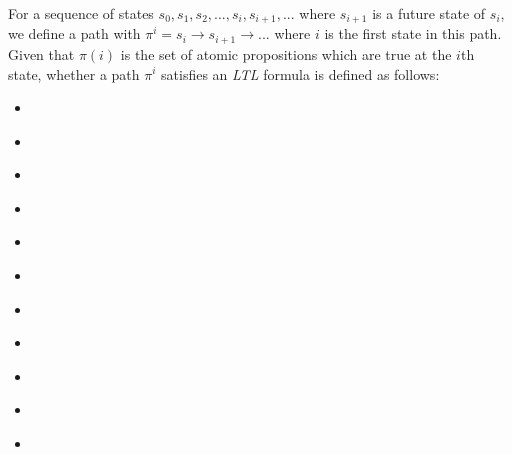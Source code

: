 For a sequence of states $s_0, s_1, s_2, ..., s_i, s_{i + 1}, ...$ where $s_{i + 1}$ is a future state of $s_i$, we define a path with $\pi^i = s_i \rightarrow s_{i + 1} \rightarrow ...$ where $i$ is the first state in this path. Given that $\pi(i)$ is the set of atomic propositions which are true at the $i$th state, whether a path $\pi^i$ satisfies an \emph{LTL} formula is defined as follows:
\begin{itemize}
  \item {} \label{eq:ap}
  \item {} \label{eq:not}
  \item {} \label{eq:and}
  \item {} \label{eq:or}
  \item {} \label{eq:then}
  \item {} \label{eq:next}
  \item {} \label{eq:global}
  \item {} \label{eq:future}
  \item {} \label{eq:until}
  \item {} \label{eq:wuntil}
  \item {} \label{eq:release}
\end{itemize}



